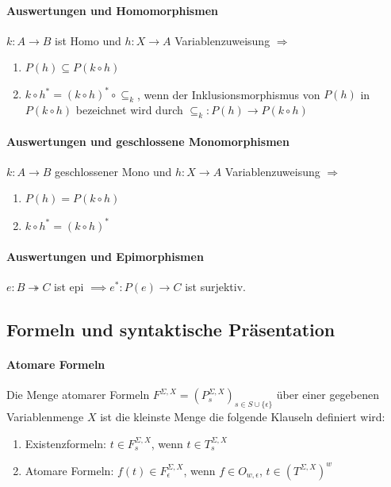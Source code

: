 \paragraph{ Auswertungen und Homomorphismen}
$k: A \rightarrow B$ ist Homo und $h: X \rightarrow A$ Variablenzuweisung $\Rightarrow$
\begin{enumerate}
\item $P(h) \subseteq P(k \circ h)$
\item $k  \circ h^* = (k \circ h)^* \circ \subseteq_k$, wenn der Inklusionsmorphismus von $P(h)$ in $P(k \circ h)$ bezeichnet wird durch $\subseteq_{k}: P(h) \rightarrow P(k \circ h)$
\end{enumerate}

\paragraph{ Auswertungen und geschlossene Monomorphismen}
$k: A \rightarrow B$ geschlossener Mono und $h: X \rightarrow A$ Variablenzuweisung $\Rightarrow$
\begin{enumerate}
\item $P(h) = P(k \circ h)$
\item $k  \circ h^* = (k \circ h)^*$
\end{enumerate}

\paragraph{ Auswertungen und Epimorphismen} 
$e: B \twoheadrightarrow C$ ist epi $\implies e^*: P(e) \rightarrow C$ ist surjektiv.


\subsection{Formeln und syntaktische Präsentation}

\paragraph{ Atomare Formeln} 
Die Menge atomarer Formeln $F^{\Sigma,X} = (P^{\Sigma,X}_s)_{s \in S \cup \{ \epsilon\}}$ über einer gegebenen Variablenmenge $X$ ist die kleinste Menge die folgende Klauseln definiert wird:
\begin{enumerate}
\item Existenzformeln: $t \in F^{\Sigma,X}_s$, wenn $t \in T^{\Sigma,X}_s$
\item Atomare Formeln: $f(t) \in F^{\Sigma,X}_{\epsilon}$, wenn $f \in O_{w,\epsilon}$, $t \in (T^{\Sigma,X})^w$
\end{enumerate}

